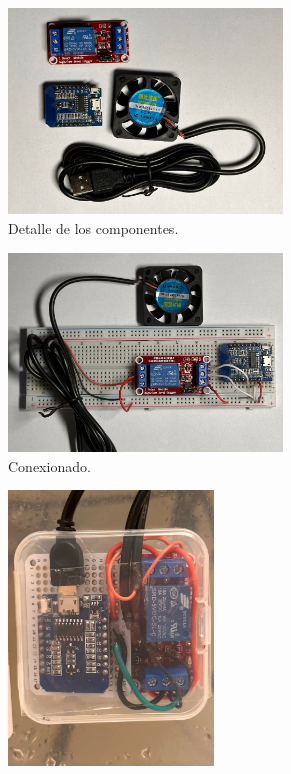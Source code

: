 \begin{figure}[!htpb]
     \centering
     \begin{subfigure}[b]{0.45\textwidth}
		\centering
		\includegraphics[width=0.80\textwidth]{./Figures/vent_control.jpg}
		\caption{Detalle de los componentes.}
		\label{fig:vent1}
     \end{subfigure}
     \hfill
     \begin{subfigure}[b]{0.45\textwidth}
	\centering
		\includegraphics[width=0.80\textwidth]{./Figures/vent_proto.jpg}
		\caption{Conexionado.}
		\label{fig:vent2}
     \end{subfigure}	
	\begin{subfigure}[b]{0.45\textwidth}
		\centering
		\includegraphics[width=0.60\textwidth]{./Figures/vent_assembled.jpg}

\end{subfigure}
\end{figure}
